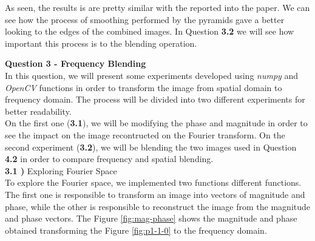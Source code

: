 \documentclass[12pt,a4paper]{article}
\begin{document}
As seen, the results is are pretty similar with the reported into the paper. We can see how the process of smoothing performed by the pyramids gave a better looking to the edges of the combined images. In Question \textbf{3.2} we will see how important this process is to the blending operation.

\newpage

\textbf{\LARGE Question 3 - Frequency Blending} \\

In this question, we will present some experiments developed using \emph{numpy} and \emph{OpenCV} functions in order to transform the image from spatial domain to frequency domain. The process will be divided into two different experiments for better readability. \\

On the first one (\textbf{3.1}), we will be modifying the phase and magnitude in order to see the impact on the image recontructed on the Fourier transform. On the second experiment (\textbf{3.2}), we will be blending the two images used in Question \textbf{4.2} in order to compare frequency and spatial blending. \\

\textbf{3.1 )} Exploring Fourier Space \\

To explore the Fourier space, we implemented two functions different functions. The first one is responsible to transform an image into vectors of magnitude and phase, while the other is responsible to reconstruct the image from the magnitude and phase vectors. The Figure \ref{fig:mag-phase} shows the magnitude and phase obtained transforming the Figure \ref{fig:p1-1-0} to the frequency domain. \\
\end{document}
